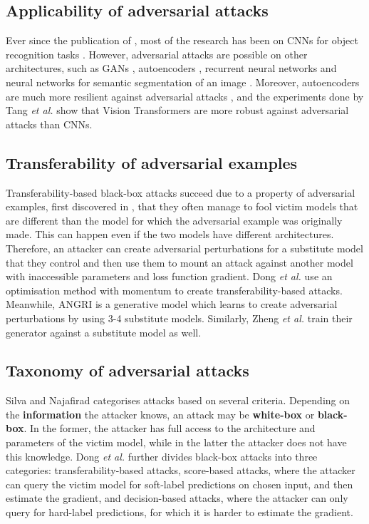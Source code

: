 \subsection{Applicability of adversarial attacks}
  
Ever since the publication of \cite{szegedy2014intriguing}, most of the research has been on CNNs for object recognition tasks \cite{akhtar}. However, adversarial attacks are possible on other architectures, such as GANs \cite{kos_attacks_on_gans}, autoencoders \cite{tabacof_attacks_autoencoders}, recurrent neural networks \cite{papernot_attacks_rnns} and neural networks for semantic segmentation of an image \cite{Metzen_2017_ICCV}. Moreover, autoencoders are much more resilient against adversarial attacks \cite{tabacof_attacks_autoencoders}, and the experiments done by Tang \textit{et al.} \cite{robustart} show that Vision Transformers are more robust against adversarial attacks than CNNs.

\subsection{Transferability of adversarial examples}

Transferability-based black-box attacks succeed due to a property of adversarial examples, first discovered in \cite{szegedy2014intriguing}, that they often manage to fool victim models that are different than the model for which the adversarial example was originally made. This can happen even if the two models have different architectures. Therefore, an attacker can create adversarial perturbations for a substitute model that they control and then use them to mount an attack against another model with inaccessible parameters and loss function gradient. Dong \textit{et al.} \cite{mim} use an optimisation method with momentum to create transferability-based attacks. Meanwhile, ANGRI \cite{upset_angri} is a generative model which learns to create adversarial perturbations by using 3-4 substitute models. Similarly, Zheng \textit{et al.} \cite{zheng_black_box_GAN} train their generator against a substitute model as well.

\subsection{Taxonomy of adversarial attacks}

Silva and Najafirad \cite{silva_survey} categorises attacks based on several criteria. Depending on the \textbf{information} the attacker knows, an attack may be \textbf{white-box} or \textbf{black-box}. In the former, the attacker has full access to the architecture and parameters of the victim model, while in the latter the attacker does not have this knowledge. Dong \textit{et al.} \cite{dong2020benchmarking} further divides black-box attacks into three categories: transferability-based attacks, score-based attacks, where the attacker can query the victim model for soft-label predictions on chosen input, and then estimate the gradient, and decision-based attacks, where the attacker can only query for hard-label predictions, for which it is harder to estimate the gradient.

